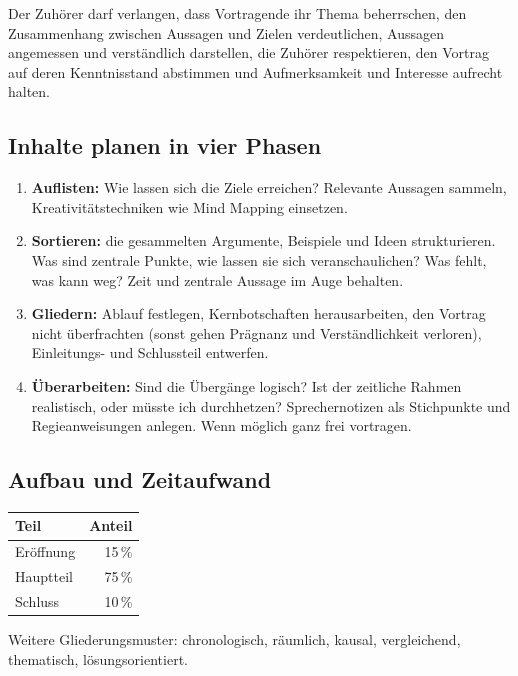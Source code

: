 \documentclass[12pt, a4paper]{article}
\begin{document}
Der Zuhörer darf verlangen, dass Vortragende ihr Thema beherrschen, den
Zusammenhang zwischen Aussagen und Zielen verdeutlichen, Aussagen angemessen
und verständlich darstellen, die Zuhörer respektieren, den Vortrag auf deren
Kenntnisstand abstimmen und Aufmerksamkeit und Interesse aufrecht halten.

\subsection{Inhalte planen in vier Phasen}

\begin{enumerate}
  \item \textbf{Auflisten:} Wie lassen sich die Ziele erreichen? Relevante
        Aussagen sammeln, Kreativitätstechniken wie Mind Mapping einsetzen.
  \item \textbf{Sortieren:} die gesammelten Argumente, Beispiele und Ideen
        strukturieren. Was sind zentrale Punkte, wie lassen sie sich
        veranschaulichen? Was fehlt, was kann weg? Zeit und zentrale Aussage
        im Auge behalten.
  \item \textbf{Gliedern:} Ablauf festlegen, Kernbotschaften herausarbeiten,
        den Vortrag nicht überfrachten (sonst gehen Prägnanz und
        Verständlichkeit verloren), Einleitungs- und Schlussteil entwerfen.
  \item \textbf{Überarbeiten:} Sind die Übergänge logisch? Ist der zeitliche
        Rahmen realistisch, oder müsste ich durchhetzen? Sprechernotizen als
        Stichpunkte und Regieanweisungen anlegen. Wenn möglich ganz frei
        vortragen.
\end{enumerate}

\subsection{Aufbau und Zeitaufwand}

\begin{center}
\begin{tabular}{lr}
\textbf{Teil} & \textbf{Anteil}\\\hline
Eröffnung & 15\,\%\\
Hauptteil & 75\,\%\\
Schluss & 10\,\%\\
\end{tabular}
\end{center}

Weitere Gliederungsmuster: chronologisch, räumlich, kausal, vergleichend,
thematisch, lösungsorientiert.
\end{document}
